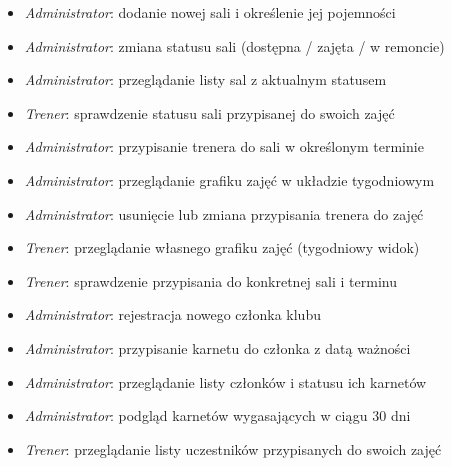\documentclass[11pt, a4paper]{article}
\newcommand{\actor}[1]{\textit{\color{secondary}#1}}
\begin{document}
\medskip

\begin{tcolorbox}[epicbox, title={Epik 2 — Zarządzanie salami}]
\begin{itemize}[leftmargin=*, itemsep=2pt, label=\color{secondary}$\triangleright$]
  \item \actor{Administrator}: dodanie nowej sali i określenie jej pojemności
  \item \actor{Administrator}: zmiana statusu sali (dostępna / zajęta / w remoncie)
  \item \actor{Administrator}: przeglądanie listy sal z aktualnym statusem
  \item \actor{Trener}: sprawdzenie statusu sali przypisanej do swoich zajęć
\end{itemize}
\end{tcolorbox}

\medskip

\begin{tcolorbox}[epicbox, title={Epik 3 — Grafik zajęć}]
\begin{itemize}[leftmargin=*, itemsep=2pt, label=\color{secondary}$\triangleright$]
  \item \actor{Administrator}: przypisanie trenera do sali w określonym terminie
  \item \actor{Administrator}: przeglądanie grafiku zajęć w układzie tygodniowym
  \item \actor{Administrator}: usunięcie lub zmiana przypisania trenera do zajęć
  \item \actor{Trener}: przeglądanie własnego grafiku zajęć (tygodniowy widok)
  \item \actor{Trener}: sprawdzenie przypisania do konkretnej sali i terminu
\end{itemize}
\end{tcolorbox}

\medskip

\begin{tcolorbox}[epicbox, title={Epik 4 — Zarządzanie członkami i karnetami}]
\begin{itemize}[leftmargin=*, itemsep=2pt, label=\color{secondary}$\triangleright$]
  \item \actor{Administrator}: rejestracja nowego członka klubu
  \item \actor{Administrator}: przypisanie karnetu do członka z datą ważności
  \item \actor{Administrator}: przeglądanie listy członków i statusu ich karnetów
  \item \actor{Administrator}: podgląd karnetów wygasających w ciągu 30 dni
  \item \actor{Trener}: przeglądanie listy uczestników przypisanych do swoich zajęć
\end{itemize}
\end{tcolorbox}
\end{document}
